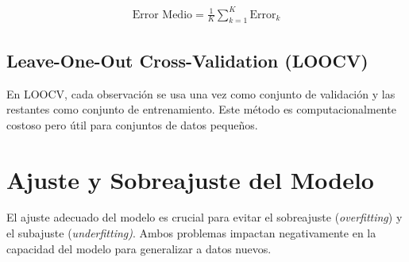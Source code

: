 \documentclass[a4paper]{report} %
\begin{document}
\begin{eqnarray}
\text{Error Medio} = \frac{1}{K} \sum_{k=1}^{K} \text{Error}_k
\end{eqnarray}
\subsection{Leave-One-Out Cross-Validation (LOOCV)}
En LOOCV, cada observaci\'on se usa una vez como conjunto de validaci\'on y las restantes como conjunto de entrenamiento. Este m\'etodo es computacionalmente costoso pero \'util para conjuntos de datos peque\~nos.

\section{Ajuste y Sobreajuste del Modelo}

El ajuste adecuado del modelo es crucial para evitar el sobreajuste (\textit{overfitting}) y el subajuste (\textit{underfitting)}. Ambos problemas impactan negativamente en la capacidad del modelo para generalizar a datos nuevos.
\end{document}
